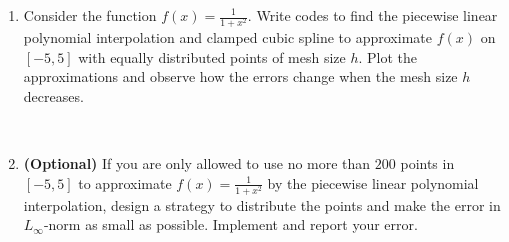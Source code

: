 \documentclass[12pt]{amsart}
\numberwithin{equation}{section}
\numberwithin{table}{section}
\numberwithin{figure}{section}
\numberwithin{algorithm}{section}
\begin{document}
\begin{enumerate}
\

\item Consider the function $f(x) = \frac{1}{1+x^2}$. Write codes to find the piecewise linear polynomial interpolation and clamped cubic spline to approximate $f(x)$ on $[-5,5]$ with equally distributed points of mesh size $h$.  Plot the approximations and observe how the errors change when the mesh size $h$ decreases. 

\

\item \textbf{(Optional)} If you are only allowed to use no more than $200$ points in $[-5,5]$ to approximate $f(x) = \frac{1}{1+x^2}$ by the piecewise linear polynomial interpolation, design a strategy to distribute the points and make the error in $L_{\infty}$-norm as small as possible. Implement and report your error.

\end{enumerate}
\end{document}
